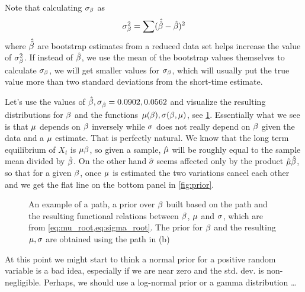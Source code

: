 \documentclass{article}
\begin{document}
Note that calculating ${\sigma }_{\beta}$ as $$ {\sigma }_{\beta}^2 = \sum(\hat{ \hat {{\beta}}} - \hat {{\beta}})^2
$$ where $\hat{ \hat {{\beta}}}$ are bootstrap estimates from a reduced data set helps
increase the value of ${\sigma }_{\beta}^2$. If instead of $\hat {{\beta}}$, we use the mean of the
bootstrap values themselves to calculate ${\sigma }_{\beta}$, we will get smaller values for
${\sigma }_{\beta}$, which will usually put the true value more than two standard deviations
from the short-time estimate.

Let's use the values of $\hat \beta, {\sigma }_{\hat{{\beta}}} =  0.0902, 0.0562$ and
visualize the resulting distributions for ${\beta}$ and the functions ${\mu }({\beta}),
{\sigma }({\beta}, {\mu })$, see \cref{fig:prior_mu_sigma}. Essentially what we see is that ${\mu }$
depends on ${\beta}$ inversely while ${\sigma }$ does not really depend on ${\beta}$ given the
data and a ${\mu }$ estimate. That is perfectly natural. We know that the long term
equilibrium of $X_t$ is ${\mu }{\beta}$, so given a sample, $\hat {{\mu }}$ will be roughly
equal to the sample mean divided by $\hat {{\beta}}$. On the other hand $\hat \sigma$
seems affected only by the product $\hat {{\mu }} \hat {{\beta}}$, so that for a given ${\beta}$,
once ${\mu }$ is estimated the two variations cancel each other and we get the flat
line on the bottom panel in \cref{fig:prior}.
\begin{figure}[h]
\begin{center}
\caption[labelInTOC]{An example of a path, a prior over ${\beta}$ built based on
the path and the resulting functional relations between ${\beta}$, ${\mu }$ and ${\sigma }$,
which are from \cref{eq:mu_root,eq:sigma_root}. The prior for ${\beta}$ and the
resulting ${\mu },{\sigma }$ are obtained using the path in (b)}
\label{fig:prior_mu_sigma}
\end{center}
\end{figure}
At this point we might start to think a normal prior for a positive random
variable is a bad idea, especially if we are near zero and the std. dev. is
non-negligible. Perhaps, we should use a log-normal prior or a gamma
distribution \ldots
\end{document}
